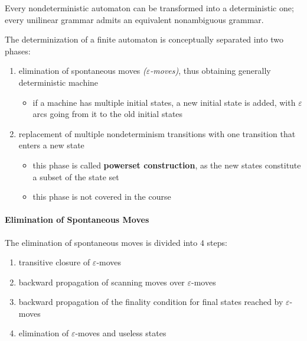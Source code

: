 \documentclass[english]{article}
\begin{document}
\begin{property}
  Every nondeterministic automaton can be transformed into a deterministic one;
  every unilinear grammar admits an equivalent nonambiguous grammar.
\end{property}

The determinization of a finite automaton is conceptually separated into two phases:

\begin{enumerate}
  \item elimination of spontaneous moves \textit{(\(\varepsilon\)-moves)}, thus obtaining generally deterministic machine
        \begin{itemize}[label=\(\rightarrow\)]
          \item if a machine has multiple initial states, a new initial state is added, with \(\varepsilon\) arcs going from it to the old initial states
        \end{itemize}
  \item replacement of multiple nondeterminism transitions with one transition that enters a new state
        \begin{itemize}[label=\(\rightarrow\)]
          \item this phase is called \textbf{powerset construction}, as the new states constitute a subset of the state set
          \item this phase is not covered in the course
        \end{itemize}
\end{enumerate}

\paragraph{Elimination of Spontaneous Moves}

The elimination of spontaneous moves is divided into \(4\) steps:

\begin{enumerate}
  \item transitive closure of \(\varepsilon\)-moves
        \begin{figure}[ht]
          \centering
          
        \end{figure}
  \item backward propagation of scanning moves over \(\varepsilon\)-moves
        \begin{figure}[ht]
          \centering
          
        \end{figure}
  \item backward propagation of the finality condition for final states reached by \(\varepsilon\)-moves
        \begin{figure}[ht]
          \centering
          
        \end{figure}
  \item elimination of \(\varepsilon\)-moves and useless states
\end{enumerate}
\end{document}
